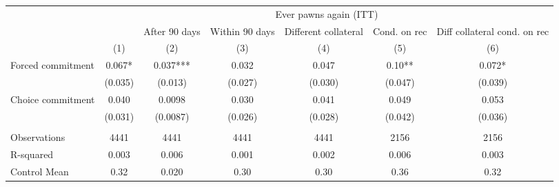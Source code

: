 \begin{tabular}{lcccccc}
\toprule
      & \multicolumn{6}{c}{Ever pawns again (ITT)} \\
\cmidrule{2-7}      &       & After 90 days & Within 90 days & Different collateral & Cond. on rec & Diff collateral cond. on rec \\
\midrule
\midrule
      & (1)   & (2)   & (3)   & (4)   & (5)   & (6) \\
\midrule
\midrule
Forced commitment & 0.067* & 0.037*** & 0.032 & 0.047 & 0.10** & 0.072* \\
      & (0.035) & (0.013) & (0.027) & (0.030) & (0.047) & (0.039) \\
Choice commitment & 0.040 & 0.0098 & 0.030 & 0.041 & 0.049 & 0.053 \\
      & (0.031) & (0.0087) & (0.026) & (0.028) & (0.042) & (0.036) \\
      &       &       &       &       &       &  \\
\midrule
Observations & 4441  & 4441  & 4441  & 4441  & 2156  & 2156 \\
R-squared & 0.003 & 0.006 & 0.001 & 0.002 & 0.006 & 0.003 \\
Control Mean & 0.32  & 0.020 & 0.30  & 0.30  & 0.36  & 0.32 \\
\bottomrule
\bottomrule
\end{tabular}%
